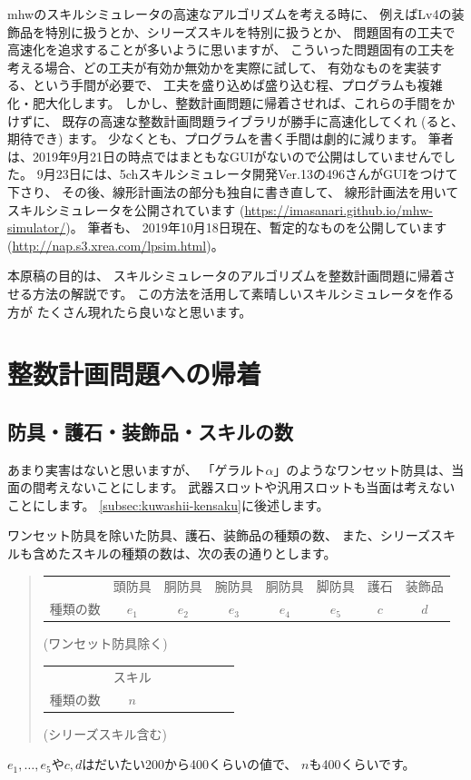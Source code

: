 \documentclass{jsarticle}
\begin{document}
mhwのスキルシミュレータの高速なアルゴリズムを考える時に、
例えばLv4の装飾品を特別に扱うとか、シリーズスキルを特別に扱うとか、
問題固有の工夫で高速化を追求することが多いように思いますが、
こういった問題固有の工夫を考える場合、どの工夫が有効か無効かを実際に試して、
有効なものを実装する、という手間が必要で、
工夫を盛り込めば盛り込む程、プログラムも複雑化・肥大化します。
%
しかし、整数計画問題に帰着させれば、これらの手間をかけずに、
既存の高速な整数計画問題ライブラリが勝手に高速化してくれ
(ると、期待でき) ます。
少なくとも、プログラムを書く手間は劇的に減ります。
%
筆者は、2019年9月21日の時点ではまともなGUIがないので公開はしていませんでした。
9月23日には、5chスキルシミュレータ開発Ver.13の496さんがGUIをつけて下さり、
その後、線形計画法の部分も独自に書き直して、
線形計画法を用いてスキルシミュレータを公開されています
(\url{https://imasanari.github.io/mhw-simulator/})。
筆者も、
2019年10月18日現在、暫定的なものを公開しています
(\url{http://nap.s3.xrea.com/lpsim.html})。

本原稿の目的は、
スキルシミュレータのアルゴリズムを整数計画問題に帰着させる方法の解説です。
この方法を活用して素晴しいスキルシミュレータを作る方が
たくさん現れたら良いなと思います。

\section{整数計画問題への帰着}
\subsection{防具・護石・装飾品・スキルの数}
あまり実害はないと思いますが、
「ゲラルト$\alpha$」のようなワンセット防具は、当面の間考えないことにします。
武器スロットや汎用スロットも当面は考えないことにします。
\ref{subsec:kuwashii-kensaku}に後述します。

ワンセット防具を除いた防具、護石、装飾品の種類の数、
また、シリーズスキルも含めたスキルの種類の数は、次の表の通りとします。
\begin{quote}
\begin{tabular}{lccccccc}
\toprule
{}        & 頭防具 & 胴防具 & 腕防具 & 胴防具 & 脚防具 & 護石 & 装飾品 \\
種類の数  & $e_1$ & $e_2$ & $e_3$ & $e_4$ & $e_5$ &  $c$ & $d$  
\\ \bottomrule
\end{tabular}
\quad (ワンセット防具除く)
\bigskip
\\
\begin{tabular}{lccccccc}
\toprule
{}        & スキル\\
種類の数  & $n$
\\ \bottomrule
\end{tabular}
\quad (シリーズスキル含む)
\end{quote}
%
$e_1, \ldots, e_5$や$c, d$はだいたい200から400くらいの値で、
$n$も400くらいです。
\end{document}
